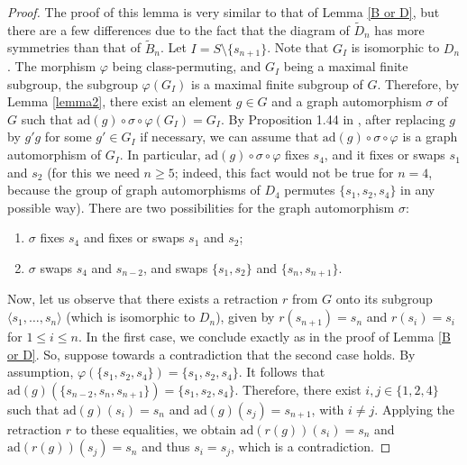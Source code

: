 \documentclass[a4paper, 11pt]{amsart}
\theoremstyle{definition}
\theoremstyle{remark}
\renewcommand{\leq}{\leqslant}
\renewcommand{\geq}{\geqslant}
\begin{document}
\begin{proof}The proof of this lemma is very similar to that of Lemma \ref{B or D}, but there are a few differences due to the fact that the diagram of $\tilde{D}_n$ has more symmetries than that of $\tilde{B}_n$. Let $I=S\setminus \lbrace s_{n+1}\rbrace$. Note that $G_I$ is isomorphic to $D_n$. The morphism $\varphi$ being class-permuting, and $G_I$ being a maximal finite subgroup, the subgroup $\varphi(G_I)$ is a maximal finite subgroup of $G$. Therefore, by Lemma \ref{lemma2}, there exist an element $g\in G$ and a graph automorphism $\sigma$ of $G$ such that $\mathrm{ad}(g)\circ \sigma \circ \varphi(G_I)=G_I$. By Proposition 1.44 in \cite{franz}, after replacing $g$ by $g'g$ for some $g'\in G_I$ if necessary, we can assume that $\mathrm{ad}(g)\circ \sigma \circ \varphi$ is a graph automorphism of $G_I$. In particular, $\mathrm{ad}(g)\circ \sigma \circ \varphi$ fixes $s_4$, and it fixes or swaps $s_1$ and $s_2$ (for this we need $n\geq 5$; indeed, this fact would not be true for $n=4$, because the group of graph automorphisms of $D_4$ permutes $\lbrace s_1,s_2,s_4\rbrace$ in any possible way). There are two possibilities for the graph automorphism $\sigma$:
\begin{enumerate}
    \item $\sigma$ fixes $s_4$ and fixes or swaps $s_1$ and $s_2$;
    \item $\sigma$ swaps $s_4$ and $s_{n-2}$, and swaps $\lbrace s_1,s_2\rbrace$ and $\lbrace s_n,s_{n+1}\rbrace$.
\end{enumerate}
Now, let us observe that there exists a retraction $r$ from $G$ onto its subgroup $\langle s_1,\ldots,s_n\rangle$ (which is isomorphic to $D_n$), given by $r(s_{n+1})=s_n$ and $r(s_i)=s_i$ for $1\leq i\leq n$. In the first case, we conclude exactly as in the proof of Lemma \ref{B or D}. So, suppose towards a contradiction that the second case holds. By assumption, $\varphi(\lbrace s_1,s_2,s_4\rbrace)=\lbrace s_1,s_2,s_4\rbrace$. It follows that $\mathrm{ad}(g)(\lbrace s_{n-2},s_n,s_{n+1}\rbrace)=\lbrace s_1,s_2,s_4\rbrace$. Therefore, there exist $i,j\in\lbrace 1,2,4\rbrace$ such that $\mathrm{ad}(g)(s_i)=s_n$ and $\mathrm{ad}(g)(s_j)=s_{n+1}$, with $i\neq j$. Applying the retraction $r$ to these equalities, we obtain $\mathrm{ad}(r(g))(s_i)=s_n$ and $\mathrm{ad}(r(g))(s_j)=s_{n}$ and thus $s_i=s_j$, which is a contradiction.\end{proof}
\end{document}
